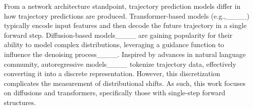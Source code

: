 From a network architecture standpoint, trajectory prediction models differ in how trajectory predictions are produced. 
Transformer-based models (e.g.,____) typically encode input features and then decode the future trajectory in a single forward step. Diffusion-based models____ are gaining popularity for their ability to model complex distributions, leveraging a guidance function to influence the denoising process____. Inspired by advances in natural language community, autoregressive models____ tokenize trajectory data, effectively converting it into a discrete representation. However, this discretization complicates the measurement of distributional shifts. As such, this work focuses on diffusions and transformers, specifically those with single-step forward structures.
